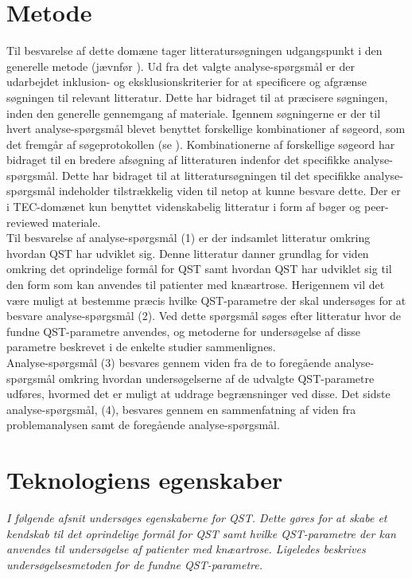 \section{Metode}
Til besvarelse af dette domæne tager litteratursøgningen  udgangspunkt i den generelle metode (jævnfør ). Ud fra det valgte analyse-spørgsmål er der udarbejdet inklusion- og eksklusionskriterier for at specificere og afgrænse søgningen til relevant litteratur. Dette har bidraget til at præcisere søgningen, inden den generelle gennemgang af materiale. Igennem søgningerne er der til hvert analyse-spørgsmål blevet benyttet forskellige kombinationer af søgeord, som det fremgår af søgeprotokollen (se ). Kombinationerne af forskellige søgeord har bidraget til en bredere afsøgning af litteraturen indenfor det specifikke analyse-spørgsmål. Dette har bidraget til at litteratursøgningen til det specifikke analyse-spørgsmål indeholder tilstrækkelig viden til netop at kunne besvare dette. Der er i TEC-domænet kun benyttet videnskabelig litteratur i form af bøger og peer-reviewed materiale. \\
Til besvarelse af analyse-spørgsmål (1) er der indsamlet litteratur omkring hvordan QST har udviklet sig. Denne litteratur danner grundlag for viden omkring det oprindelige formål for QST samt hvordan QST har udviklet sig til den form som kan anvendes til patienter med knæartrose. Herigennem vil det være muligt at bestemme præcis hvilke QST-parametre der skal undersøges for at besvare analyse-spørgsmål (2). Ved dette spørgsmål søges efter litteratur hvor de fundne QST-parametre anvendes, og metoderne for undersøgelse af disse parametre beskrevet i de enkelte studier sammenlignes. \\
Analyse-spørgsmål (3) besvares gennem viden fra de to foregående analyse-spørgsmål omkring hvordan undersøgelserne af de udvalgte QST-parametre udføres, hvormed det er muligt at uddrage begrænsninger ved disse. Det sidste analyse-spørgsmål, (4), besvares gennem en sammenfatning af viden fra problemanalysen samt de foregående analyse-spørgsmål.   
 
\section{Teknologiens egenskaber}
\textit{I følgende afsnit undersøges egenskaberne for QST. Dette gøres for at skabe et kendskab til det oprindelige formål for QST samt hvilke QST-parametre der kan anvendes til undersøgelse af patienter med knæartrose. Ligeledes beskrives undersøgelsesmetoden for de fundne QST-parametre.}


